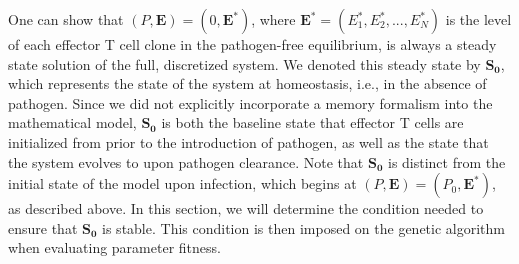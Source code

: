 One can show that $(P,\boldsymbol{E})=(0,\boldsymbol{E^*})$, where $\boldsymbol{E^*}=(E_1^*,E_2^*,...,E_N^*)$ is the level of each effector T cell clone in the pathogen-free equilibrium, is always a steady state solution of the full, discretized system. We denoted this steady state by $\boldsymbol{S_0}$, which represents the state of the system at homeostasis, i.e., in the absence of pathogen. Since we did not explicitly incorporate a memory formalism into the mathematical model, $\boldsymbol{S_0}$ is both the baseline state that effector T cells are initialized from prior to the introduction of pathogen, as well as the state that the system evolves to upon pathogen clearance. Note that $\boldsymbol{S_0}$ is distinct from the initial state of the model upon infection, which begins at $(P,\boldsymbol{E})=(P_0,\boldsymbol{E^*})$, as described above. In this section, we will determine the condition needed to ensure that $\boldsymbol{S_0}$ is stable. This condition is then imposed on the genetic algorithm when evaluating parameter fitness.

